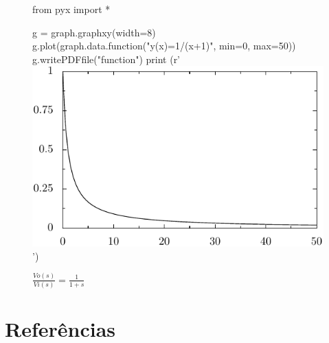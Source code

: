 \documentclass[12pt]{article}
\begin{document}
\begin{figure}[h]
\centering
\begin{pycode}

from pyx import *

g = graph.graphxy(width=8)
g.plot(graph.data.function("y(x)=1/(x+1)", min=0, max=50))
g.writePDFfile("function")
print (r'\includegraphics{function}')
\end{pycode}
\caption{$\frac{Vo(s)}{Vi(s)}=$$\frac{1}{1+s}$}
\end{figure}

\section{Referências}




\end{document}
